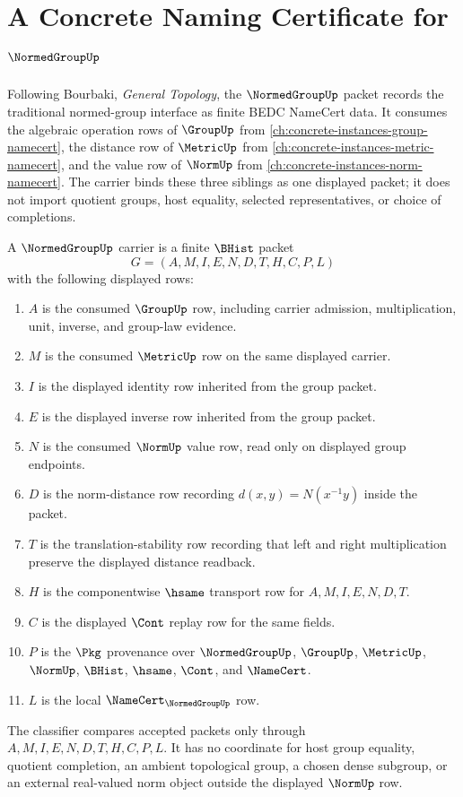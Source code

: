 \chapter{A Concrete Naming Certificate for $\NormedGroupUp$}
\label{ch:concrete-instances-normed-group-namecert}

Following Bourbaki, \emph{General Topology}, the $\NormedGroupUp$ packet records the traditional normed-group interface as finite BEDC NameCert data. It consumes the algebraic operation rows of $\GroupUp$ from \autoref{ch:concrete-instances-group-namecert}, the distance row of $\MetricUp$ from \autoref{ch:concrete-instances-metric-namecert}, and the value row of $\NormUp$ from \autoref{ch:concrete-instances-norm-namecert}. The carrier binds these three siblings as one displayed packet; it does not import quotient groups, host equality, selected representatives, or choice of completions.

\begin{definition}
\label{def:normed-group-carrier}
A $\NormedGroupUp$ carrier is a finite $\BHist$ packet
$$
G=(A,M,I,E,N,D,T,H,C,P,L)
$$
with the following displayed rows:
\begin{enumerate}
\item $A$ is the consumed $\GroupUp$ row, including carrier admission, multiplication, unit, inverse, and group-law evidence.
\item $M$ is the consumed $\MetricUp$ row on the same displayed carrier.
\item $I$ is the displayed identity row inherited from the group packet.
\item $E$ is the displayed inverse row inherited from the group packet.
\item $N$ is the consumed $\NormUp$ value row, read only on displayed group endpoints.
\item $D$ is the norm-distance row recording $d(x,y)=N(x^{-1}y)$ inside the packet.
\item $T$ is the translation-stability row recording that left and right multiplication preserve the displayed distance readback.
\item $H$ is the componentwise $\hsame$ transport row for $A,M,I,E,N,D,T$.
\item $C$ is the displayed $\Cont$ replay row for the same fields.
\item $P$ is the $\Pkg$ provenance over $\NormedGroupUp$, $\GroupUp$, $\MetricUp$, $\NormUp$, $\BHist$, $\hsame$, $\Cont$, and $\NameCert$.
\item $L$ is the local $\NameCert_{\NormedGroupUp}$ row.
\end{enumerate}
The classifier compares accepted packets only through $A,M,I,E,N,D,T,H,C,P,L$. It has no coordinate for host group equality, quotient completion, an ambient topological group, a chosen dense subgroup, or an external real-valued norm object outside the displayed $\NormUp$ row.
\end{definition}

